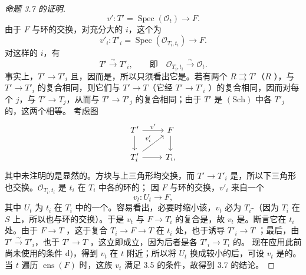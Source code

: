 \begin{proof}[命题 3.7 的证明]
\[v':T'=\operatorname{Spec}(\mathscr O_t)\longrightarrow F.\]
由于 $F$ 与环的交换，对充分大的 $i$，这个为
\[v'_i:T'_i=\operatorname{Spec}(\mathscr O_{T_i,t_i})\longrightarrow F.\]
对这样的 $i$，有
\[T'\xrightarrow\sim T'_i,\qquad\text{即}\quad \mathscr O_{T_i,t_i}\xrightarrow\sim\mathscr O_t.\]
事实上，$T'\to T'_i$ 且，因而是，所以只须看出它是。若有两个 $R\rightrightarrows T'$（$R$ ），与 $T'\to T'_i$ 的复合相同，则它们与 $T'\to T$（它经 $T'\to T'_i$ ）的复合相同，因而对每个 $j$，与 $T'\to T_j$，从而与 $T'\to T'_j$ 的复合相同；由于 $T'$ 是 $(\mathrm{Sch})$ 中各 $T'_j$ 的，这两个相等。
考虑图
\[\begin{tikzcd}T'\arrow[r,"v'"]\arrow[d]&F\arrow[d]\\T'_i\arrow[r]\arrow[ur,"v'_i"]&T_i,\end{tikzcd}\]
其中未注明的是显然的。方块与上三角形均交换，而 $T'\to T'_i$ 是，所以下三角形也交换。$\mathscr O_{T_i,t_i}$ 是 $t_i$ 在 $T_i$ 中各的环的；
因 $F$ 与环的交换，$v'_i$ 来自一个
\[v_t:U_t\longrightarrow F,\]
其中 $U_t$ 为 $t_i$ 在 $T_i$ 中的一个。容易看出，必要时缩小该，$v_t$ 必为 $T_i$-（因为 $T_i$ 在 $S$ 上，所以也与环的交换）。于是 $v_t$ 与 $F\to T_i$ 的复合是，故 $v_t$ 是。断言它在 $t_i$ 处。由于 $F\to T$ ，这于复合 $T_i\to F\to T$ 在 $t_i$ 处，也于诱导 $T'_i\to T$ ；最后，由 $T'\xrightarrow\sim T'_i$，也于 $T'\to T$ ，这立即成立，因为后者是各 $T'_i\to T_i$ 的。
现在应用此前尚未使用的条件 d)，得到 $v_t$ 在 $t$ 附近；所以将 $U_t$ 换成较小的后，可设 $v_t$ 是的。
当 $t$ 遍历 $\operatorname{ens}(F)$ 时，这族 $v_t$ 满足 3.5 的条件，故得到 3.7 的结论。
\end{proof}
